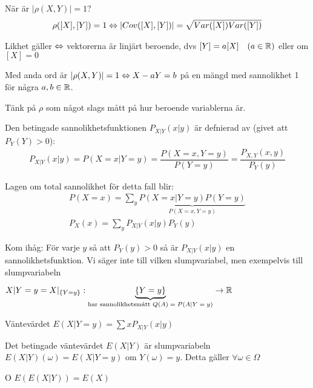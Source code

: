 \par\bigskip
\noindent När är $\left|\rho(X,Y)\right|=1$?
\begin{equation*}
  \begin{gathered}
    \rho([X],[Y])=1\Leftrightarrow \left|Cov([X],[Y])\right|= \sqrt{Var([X])Var([Y])}
  \end{gathered}
\end{equation*}\par
\noindent Likhet gäller $\Leftrightarrow$ vektorerna är linjärt beroende, dvs $[Y] = a[X]\quad (a\in\mathbb{R})$ eller om $[X] =0$\par
\noindent Med anda ord är $\left|\rho(X,Y)\right| = 1\Leftrightarrow X-aY = b$ på en mängd med sannolikhet 1 för några $a,b\in\mathbb{R}$.
\par\bigskip
\noindent Tänk på $\rho$ som något slags mått på hur beroende variablerna är.
\par\bigskip
\noindent Den betingade sannolikhetsfunktionen $P_{X|Y}(x|y)$ är defnierad av (givet att $P_Y(Y)>0$):
\begin{equation*}
  \begin{gathered}
    P_{X|Y}(x|y) = P(X=x|Y=y) =\dfrac{P(X=x,Y=y)}{P(Y=y)}  = \dfrac{P_{X,Y}(x,y)}{P_Y(y)}
  \end{gathered}
\end{equation*}
\par\bigskip
\noindent Lagen om total sannolikhet för detta fall blir:
\begin{equation*}
  \begin{gathered}
    P(X=x) = \sum_{y}\underbrace{P(X=x|Y=y)P(Y=y)}_{\text{$P(X=x,Y=y)$}}\\
    P_X(x) = \sum_{y}P_{X|Y}(x|y)P_Y(y)
  \end{gathered}
\end{equation*}
\par\bigskip
\noindent Kom ihåg: För varje $y$ så att $P_Y(y)>0$ så är $P_{X|Y}(x|y)$ en sannolikhetsfunktion. Vi säger inte till vilken slumpvariabel, men exempelvis till slumpvariabeln\par $X|Y=y=X|_{\{Y=y\}}:\underbrace{\left\{Y=y\right\}}_{\text{har sannolikhetsmått $Q(A)=P(A|Y=y)$}}\to\mathbb{R}$
\par\bigskip
\noindent Väntevärdet $E(X|Y=y) = \sum xP_{X|Y}(x|y)$
\par\bigskip
\noindent Det betingade väntevärdet $E(X|Y)$ är slumpvariabeln $E(X|Y)(\omega)=E(X|Y=y)$ om $Y(\omega) = y$. Detta gäller $\forall \omega\in\Omega$
\par\bigskip
\begin{theo}
  O $E(E(X|Y)) = E(X)$
\end{theo}
